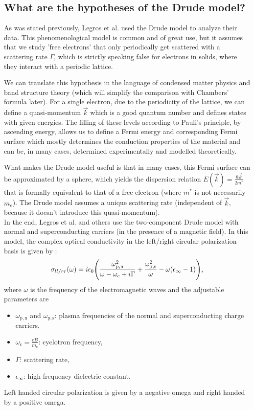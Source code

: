 \subsection{What are the hypotheses of the Drude model?}
As was stated previously, Legros et al. used the Drude model to analyze their data. 
This phenomenological model is common and of great use, but it assumes that we study 'free electrons' that only periodically get scattered with a scattering rate $\Gamma$, 
which is strictly speaking false for electrons in solids, 
where they interact with a periodic lattice.

We can translate this hypothesis in the language of condensed matter physics and band structure theory (which will simplify the comparison with Chambers' formula later). 
For a single electron, due to the periodicity of the lattice, 
we can define a quasi-momentum $\vec{k}$ which is a good quantum number and defines states with given energies. 
The filling of these levels according to Pauli's principle, by ascending energy, 
allows us to define a Fermi energy and corresponding Fermi surface 
which mostly determines the conduction properties of the material and can be, 
in many cases, determined experimentally and modelled theoretically.

What makes the Drude model useful is that in many cases, 
this Fermi surface can be approximated by a sphere, which yields the dispersion relation $E(\vec{k}) = \frac{\hbar\vec{k}}{2m^*}$ 
that is formally equivalent to that of a free electron (where $m^*$ is not necessarily $m_e$). 
The Drude model assumes a unique scattering rate (independent of $\vec{k}$, because it doesn't introduce this quasi-momentum). \\

In the end, Legros et al.\cite{legros2022} and others\cite{post2021} use the two-component Drude model with normal and superconducting carriers (in the presence of a magnetic field). 
In this model, the complex optical conductivity in the left/right circular polarization basis is given by :
\begin{equation}
    \sigma_{ll/rr}(\omega) = i\epsilon_0\qty(
        \frac{\omega^2_{\mathrm{p,n}}}{\omega-\omega_c+i\Gamma}
        + \frac{\omega^2_{\mathrm{p,s}}}{\omega} - \omega(\epsilon_{\infty} - 1)),
\end{equation}
where $\omega$ is the frequency of the electromagnetic waves and the adjustable parameters are
\begin{itemize}
    \item $\omega_{\mathrm{p,n}}$ and $\omega_{\mathrm{p,s}}$: plasma frequencies of the normal and
        superconducting charge carriers,
    \item $\omega_c = \frac{eB}{m_c}$: cyclotron frequency,
    \item $\Gamma$: scattering rate,
    \item $\epsilon_{\infty}$: high-frequency dielectric constant.
\end{itemize}
Left handed circular polarization is given by a negative omega and right handed by a positive omega.

